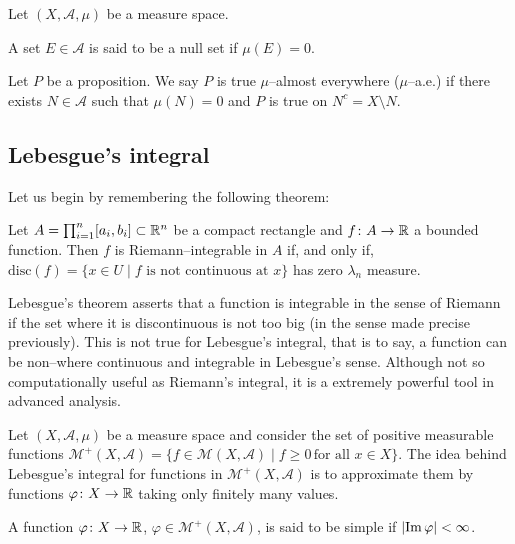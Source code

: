 \begin{definition*}
	Let $(X, \mathcal{A}, \mu)$ be a measure space.
	\begin{enumeratedef}
		\item A set $E \in \mathcal{A}$ is said to be a null set if $\mu(E) = 0$.
		\item Let $P$ be a proposition. We say $P$ is true $\mu$--almost
		everywhere ($\mu$--a.e.) if there exists $N \in \mathcal{A}$ such that
		$\mu(N) = 0$ and $P$ is true on $N^c = X \setminus N$.
	\end{enumeratedef}	
\end{definition*}


\subsection{Lebesgue's integral}

Let us begin by remembering the following theorem:

\begin{theorem}
	Let $A = \prod_{i=1}^n [a_i, b_i] \subset \mathbb{R}^n$ be a compact rectangle
	and $f \colon A \rightarrow \mathbb{R}$ a bounded function. Then $f$ is
	Riemann--integrable in $A$ if, and only if, $\mathrm{disc}(f) = \{ x \in U
	\mid f \text{ is not continuous at } x \}$ has zero $\lambda_n$ measure.
\end{theorem}

Lebesgue's theorem asserts that a function is integrable in the sense of Riemann
if the set where it is discontinuous is not too big (in the sense made precise
previously). This is not true for Lebesgue's integral, that is to say, a
function can be non--where continuous and integrable in Lebesgue's sense.
Although not so computationally useful as Riemann's integral, it is a extremely
powerful tool in advanced analysis.

Let $(X, \mathcal{A}, \mu)$ be a measure space and consider the set of positive
measurable functions $\mathcal{M}^+(X, \mathcal{A}) = \{ f \in \mathcal{M}(X,
\mathcal{A}) \mid f \geq 0 \, \text{for all } x \in X \}$. The idea behind
Lebesgue's integral for functions in $\mathcal{M}^+(X, \mathcal{A})$ is to
approximate them by functions $\varphi \colon X \rightarrow \mathbb{R}$ taking only
finitely many values.

\begin{definition*}
	A function $\varphi \colon X \rightarrow \mathbb{R}$, $\varphi \in
	\mathcal{M}^+(X, \mathcal{A})$, is said to be simple if $\abs{\operatorname{Im}{\varphi}} < \infty$.
\end{definition*}

